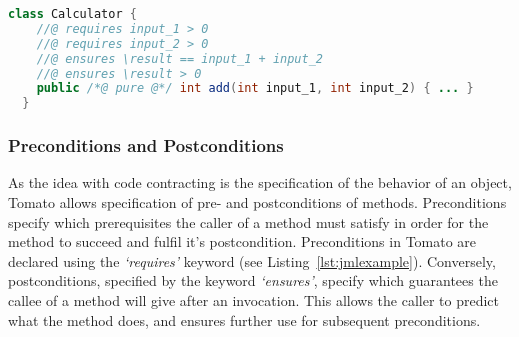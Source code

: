 \begin{lstlisting}[language=Java,caption={Contracted Method for Adding Natural Numbers},label={lst:jmlexample}]
  class Calculator {
    //@ requires input_1 > 0
    //@ requires input_2 > 0
    //@ ensures \result == input_1 + input_2
    //@ ensures \result > 0
    public /*@ pure @*/ int add(int input_1, int input_2) { ... }
  }
\end{lstlisting}

\subsubsection{Preconditions and Postconditions}
\label{sub:Preconditions and Postconditions}

As the idea with code contracting is the specification of the behavior of
an object, Tomato allows specification of pre- and postconditions of methods.
Preconditions specify which prerequisites the caller of a method must
satisfy in order for the method to succeed and fulfil it's postcondition.
Preconditions in Tomato are declared using the \emph{`requires'}
keyword (see Listing~\ref{lst:jmlexample}).
Conversely, postconditions, specified by the keyword \emph{`ensures'},
specify which guarantees the callee of a method will give after an invocation.
This allows the caller to predict what the method does,
and ensures further use for subsequent preconditions.

